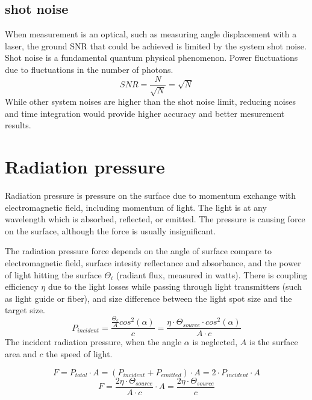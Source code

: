 \documentclass[\main/master.tex]{subfiles}
\begin{document}
\subsection{shot noise}
When measurement is an optical, such as measuring angle displacement with a laser, the ground SNR that could be achieved is limited by the system shot noise. Shot noise is a fundamental quantum physical phenomenon. Power fluctuations due to fluctuations in the number of photons. 
\begin{equation}
SNR = \frac{N}{\sqrt{N}} = \sqrt{N}    \label{eqn:shot_noise}
\end{equation}
While other system noises are higher than the shot noise limit, reducing noises and time integration would provide higher accuracy and better mesurement results. 







\section{Radiation pressure}
Radiation pressure is pressure on the surface due to momentum exchange with electromagnetic field, including momentum of light. The light is at any wavelength which is absorbed, reflected, or emitted. The pressure is causing force on the surface, although the force is usually insignificant.
  
\par
The radiation pressure force depends on the angle of surface compare to electromagnetic field, surface intesity reflectance and absorbance, and the power of light hitting the surface $\Theta_i$ (radiant flux, measured in watts). There is coupling efficiency $\eta$ due to the light losses while passing through light transmitters (such as light guide or fiber), and size difference between the light spot size and the target size.
\begin{equation}
P_{incident} = \frac{\frac{\Theta_e}{A}cos^2(\alpha)}{c} = \frac{\eta\cdot \Theta_{source}\cdot cos^2(\alpha)}{{A\cdot c}} \label{eqn:energy-mass-equivalence-relation}
\end{equation}
The incident radiation pressure, when the angle $\alpha$ is neglected, $A$ is the surface area and $c$ the speed of light.

\begin{equation}
F = P_{total}\cdot A = (P_{incident}+P_{emitted})\cdot A = 2\cdot P_{incident}\cdot A\label{eqn:energy-mass-equivalence-relation}
\end{equation}
\begin{equation}
F = \frac{2\eta\cdot\Theta_{source}}{{A\cdot c}}\cdot A = \frac{2\eta\cdot\Theta_{source}}{{c}} \label{eqn:energy-mass-equivalence-relation}
\end{equation}
\end{document}
